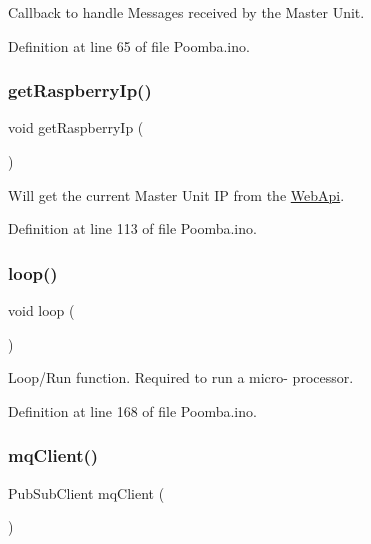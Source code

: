 Callback to handle Messages received by the Master Unit. 

Definition at line 65 of file Poomba.\+ino.

\mbox{\label{_poomba_8ino_a7a69432900bad935bd00eb0a9d4bf61f}} 
\subsubsection{\texorpdfstring{get\+Raspberry\+Ip()}{getRaspberryIp()}}
{\footnotesize\ttfamily void get\+Raspberry\+Ip (\begin{DoxyParamCaption}{ }\end{DoxyParamCaption})}

Will get the current Master Unit IP from the \mbox{\hyperlink{namespace_web_api}{Web\+Api}}. 

Definition at line 113 of file Poomba.\+ino.

\mbox{\label{_poomba_8ino_afe461d27b9c48d5921c00d521181f12f}} 
\subsubsection{\texorpdfstring{loop()}{loop()}}
{\footnotesize\ttfamily void loop (\begin{DoxyParamCaption}{ }\end{DoxyParamCaption})}

Loop/\+Run function. Required to run a micro-\/ processor. 

Definition at line 168 of file Poomba.\+ino.

\mbox{\label{_poomba_8ino_a3723ecd4627fe1acd7f94dd266f1105a}} 
\subsubsection{\texorpdfstring{mq\+Client()}{mqClient()}}
{\footnotesize\ttfamily Pub\+Sub\+Client mq\+Client (\begin{DoxyParamCaption}\item[{\mbox{\hyperlink{_snap_box_8ino_abd77e757e4b3bb6f1e4b42b21ea9e040}{esp\+Client}}}]{ }\end{DoxyParamCaption})}

